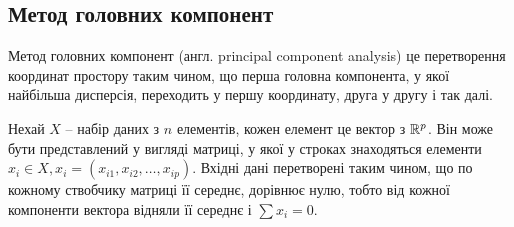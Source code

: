 
\subsection{Метод головних компонент}


Метод головних компонент (англ. principal component analysis) це перетворення координат простору таким чином, що перша головна компонента, у якої найбільша дисперсія, переходить у першу координату, друга у другу і так далі.

Нехай $X$ -- набір даних з $n$ елементів, кожен елемент це вектор з $\Bbb R^p$. Він може бути представлений у вигляді матриці, у якої у строках знаходяться елементи $x_i \in X, x_i = (x_{i1}, x_{i2}, \dots, x_{ip})$. Вхідні дані перетворені таким чином, що по кожному ствобчику матриці її середнє,  дорівнює нулю, тобто від кожної компоненти вектора відняли її середнє і $\sum x_i  = 0$.


% 
% 
% 
% 
% 
% 


